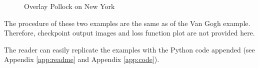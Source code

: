     \begin{figure}[!hbt]
    \center
    \caption{Overlay Pollock on New York}
    \label{fig:results:jp}
    \end{figure}

The procedure of these two examples are the same as of the Van Gogh example.
Therefore, checkpoint output images and loss function plot are not provided here.

The reader can easily replicate the examples with the Python code appended
(see Appendix \ref{app:readme} and Appendix \ref{app:code}).
